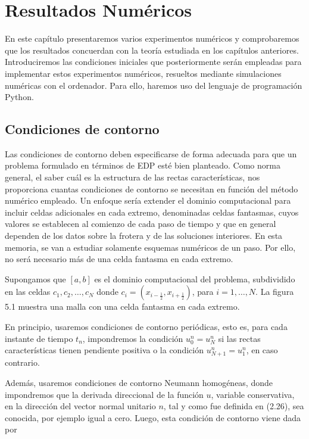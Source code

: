 \chapter{Resultados Numéricos}\label{ch:results}

En este capítulo presentaremos varios experimentos numéricos y
comprobaremos que los resultados concuerdan con la teoría estudiada
en los capítulos anteriores.
Introduciremos las condiciones iniciales que posteriormente serán
empleadas para implementar estos experimentos numéricos, resueltos
mediante simulaciones numéricas con el ordenador.
Para ello, haremos uso del lenguaje de programación Python.

\section{Condiciones de contorno}

Las condiciones de contorno deben especificarse de forma adecuada
para que un problema formulado en términos de EDP esté bien planteado.
Como norma general, el saber cuál es la estructura de las rectas
características, nos proporciona cuantas condiciones de contorno se
necesitan en función del método numérico empleado.
Un enfoque sería extender el dominio computacional para incluir
celdas adicionales en cada extremo, denominadas celdas fantasmas,
cuyos valores se establecen al comienzo de cada paso de tiempo y que
en general dependen de los datos sobre la frotera y de las soluciones
interiores.
En esta memoria, se van a estudiar solamente esquemas numéricos de un
paso.
Por ello, no será necesario más de una celda fantasma en cada extremo.

Supongamos que $\left[a,b\right]$ es el dominio computacional del
problema, subdividido en las celdas $c_{1},c_{2},\dotsc,c_{N}$ donde
$c_{i}=\left(x_{i-\frac{1}{2}},x_{i+\frac{1}{2}}\right)$, para
$i=1,\dotsc,N$.
La figura 5.1 muestra una malla con una celda fantasma en cada
extremo.

En principio, usaremos condiciones de contorno periódicas, esto es,
para cada instante de tiempo $t_{n}$, impondremos la condición
$u^{n}_{0}=u^{n}_{N}$ si las rectas características tienen pendiente
positiva o la condición $u^{n}_{N+1}=u^{n}_{1}$, en caso contrario.

Además, usaremos condiciones de contorno Neumann homogéneas, donde
impondremos que la derivada direccional de la función $u$, variable
conservativa, en la dirección del vector normal unitario $n$, tal y
como fue definida en (2.26), sea conocida, por ejemplo igual a cero.
Luego, esta condición de contorno viene dada por

